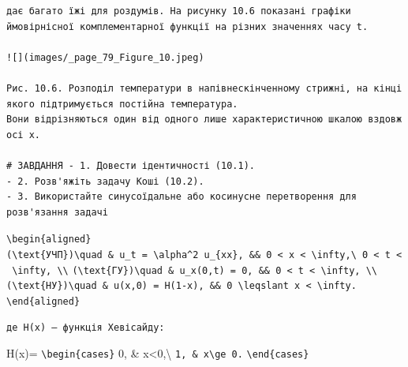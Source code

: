 \documentclass[
  ukrainian,
]{article}
\begin{document}
\begin{verbatim}
дає багато їжі для роздумів. На рисунку 10.6 показані графіки ймовірнісної комплементарної функції на різних значеннях часу t.

![](images/_page_79_Figure_10.jpeg)

Рис. 10.6. Розподіл температури в напівнескінченному стрижні, на кінці якого підтримується постійна температура.
Вони відрізняються один від одного лише характеристичною шкалою вздовж осі x.

# ЗАВДАННЯ - 1. Довести ідентичності (10.1).
- 2. Розв'яжіть задачу Коші (10.2).
- 3. Використайте синусоїдальне або косинусне перетворення для розв'язання задачі
\end{verbatim}

\texttt{\textbackslash{}begin\{aligned\}}
\texttt{(\textbackslash{}text\{УЧП\})\textbackslash{}quad\ \&\ u\_t\ =\ \textbackslash{}alpha\^{}2\ u\_\{xx\},\ \&\&\ 0\ \textless{}\ x\ \textless{}\ \textbackslash{}infty,\textbackslash{}\ 0\ \textless{}\ t\ \textless{}\ \textbackslash{}infty,\ \textbackslash{}\textbackslash{}}
\texttt{(\textbackslash{}text\{ГУ\})\textbackslash{}quad\ \&\ u\_x(0,t)\ =\ 0,\ \&\&\ 0\ \textless{}\ t\ \textless{}\ \textbackslash{}infty,\ \textbackslash{}\textbackslash{}}
\texttt{(\textbackslash{}text\{НУ\})\textbackslash{}quad\ \&\ u(x,0)\ =\ H(1-x),\ \&\&\ 0\ \textbackslash{}leqslant\ x\ \textless{}\ \textbackslash{}infty.}
\texttt{\textbackslash{}end\{aligned\}}

\begin{verbatim}
де H(x) — функція Хевісайду:
\end{verbatim}

H(x)= \texttt{\textbackslash{}begin\{cases\}} 0, \&
x\textless0,\textbackslash{} \texttt{1,\ \&\ x\textbackslash{}ge\ 0.}
\texttt{\textbackslash{}end\{cases\}}
\end{document}
